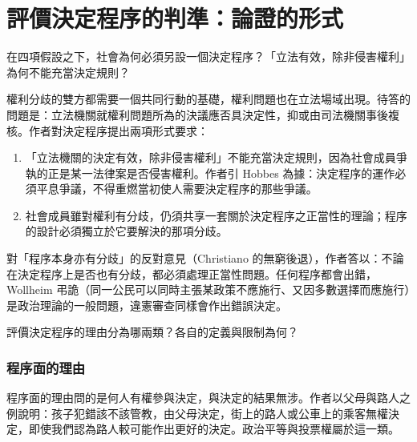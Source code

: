 \chapter{評價決定程序的判準：論證的形式}


\begin{qaquestion}
在四項假設之下，社會為何必須另設一個決定程序？「立法有效，除非侵害權利」為何不能充當決定規則？
\end{qaquestion}

權利分歧的雙方都需要一個共同行動的基礎，權利問題也在立法場域出現。待答的問題是：立法機關就權利問題所為的決議應否具決定性，抑或由司法機關事後複核。作者對決定程序提出兩項形式要求：

\begin{enumerate}
\item 「立法機關的決定有效，除非侵害權利」不能充當決定規則，因為社會成員爭執的正是某一法律案是否侵害權利。作者引 Hobbes 為據：決定程序的運作必須平息爭議，不得重燃當初使人需要決定程序的那些爭議。
\item 社會成員雖對權利有分歧，仍須共享一套關於決定程序之正當性的理論；程序的設計必須獨立於它要解決的那項分歧。
\end{enumerate}

對「程序本身亦有分歧」的反對意見（Christiano 的無窮後退），作者答以：不論在決定程序上是否也有分歧，都必須處理正當性問題。任何程序都會出錯，Wollheim 弔詭（同一公民可以同時主張某政策不應施行、又因多數選擇而應施行）是政治理論的一般問題，違憲審查同樣會作出錯誤決定。


\begin{qaquestion}
評價決定程序的理由分為哪兩類？各自的定義與限制為何？
\end{qaquestion}

\subsection{程序面的理由}

程序面的理由問的是何人有權參與決定，與決定的結果無涉。作者以父母與路人之例說明：孩子犯錯該不該管教，由父母決定，街上的路人或公車上的乘客無權決定，即使我們認為路人較可能作出更好的決定。政治平等與投票權屬於這一類。

